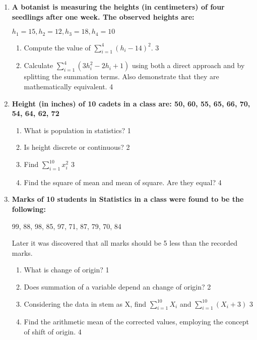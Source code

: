 \documentclass[a4paper,oneside]{book}
\begin{document}
\begin{enumerate}
\item
\textbf{A botanist is measuring the heights (in centimeters) of four seedlings after one week. The observed heights are:}
\begin{center}
$h_1 = 15, h_2 = 12, h_3 = 18, h_4 = 10$
\end{center}
\begin{enumerate}
    \item Compute the value of $\displaystyle \sum_{i=1}^4 (h_i - 14)^2$. \hfill 3
    \item Calculate $\displaystyle \sum_{i=1}^4 (3h_i^2 - 2h_i + 1)$ using both a direct approach and by splitting the summation terms. Also demonstrate that they are mathematically equivalent. \hfill 4
\end{enumerate}

 \item
	  \textbf{Height (in inches) of 10 cadets in a class are: 50, 60, 55, 65, 66, 70, 54, 64, 62, 72} 
	 
  \begin{enumerate}
    \item
	What is population in statistics? \hfill 1
    \item
	Is height discrete or continuous? \hfill 2
    \item  
	Find $\displaystyle \sum_{i=1}^{10} x_i^2$ \hfill 3
    \item
	Find the square of mean and mean of square. Are they equal? \hfill 4
  \end{enumerate}
  
   \item
	  \textbf{Marks of 10 students in Statistics in a class were found to be the following:} 
	 
	 \begin{center} 
	  99, 88, 98, 85, 97, 71, 87, 79, 70, 84
	  
	  \end{center}
	  
	  Later it was discovered that all marks should be 5 less than the recorded marks. 
  
  \begin{enumerate}
    \item
	What is change of origin? \hfill 1
    \item
	Does summation of a variable depend an change of origin?  \hfill 2
    \item  
	Considering the data in stem as X, find $\displaystyle \sum_{i=1}^{10} X_i$ and $\displaystyle \sum_{i=1}^{10} (X_i+3)$ \hfill 3
    \item
	Find the arithmetic mean of the corrected values, employing the concept of shift of origin. \hfill 4
  \end{enumerate}


\end{enumerate}
\end{document}
